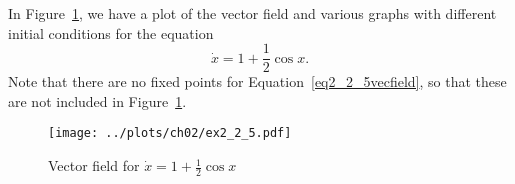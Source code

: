
In Figure~\ref{fig2_2_5vecfield}, we have a plot of the vector field and various graphs 
with different initial conditions for the equation 
\begin{equation}
    \dot{x} = 1 + \frac{1}{2}\cos{x}.
    \label{eq2_2_5vecfield}
\end{equation}
Note that there are no fixed points for Equation~\eqref{eq2_2_5vecfield}, so that these 
are not included in Figure~\ref{fig2_2_5vecfield}.
\begin{figure}[!ht]
    \texttt{[image: ../plots/ch02/ex2\_2\_5.pdf]}
    \caption{Vector field for $\dot{x} = 1 + \frac{1}{2}\cos{x}$
        \label{fig2_2_5vecfield}}
\end{figure}
